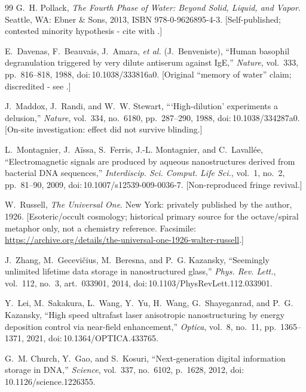 \documentclass[11pt]{article}
\theoremstyle{definition}
\begin{document}
\begin{thebibliography}{99}
G.~H. Pollack, \emph{The Fourth Phase of Water: Beyond Solid, Liquid, and Vapor}. Seattle,
WA: Ebner \& Sons, 2013, ISBN 978-0-9626895-4-3. [Self-published; contested minority
hypothesis - cite with \cite{elton2020ez}.]

E.~Davenas, F.~Beauvais, J.~Amara, \emph{et al.} (J.~Benveniste), ``Human basophil
degranulation triggered by very dilute antiserum against IgE,'' \emph{Nature}, vol.~333,
pp.~816--818, 1988, doi:\,10.1038/333816a0. [Original ``memory of water'' claim;
discredited - see \cite{maddox1988}.]

J.~Maddox, J.~Randi, and W.~W. Stewart, ```High-dilution' experiments a delusion,''
\emph{Nature}, vol.~334, no.~6180, pp.~287--290, 1988, doi:\,10.1038/334287a0. [On-site
investigation: effect did not survive blinding.]

L.~Montagnier, J.~A\"issa, S.~Ferris, J.-L. Montagnier, and C.~Lavall\'ee, ``Electromagnetic
signals are produced by aqueous nanostructures derived from bacterial DNA sequences,''
\emph{Interdiscip. Sci. Comput. Life Sci.}, vol.~1, no.~2, pp.~81--90, 2009,
doi:\,10.1007/s12539-009-0036-7. [Non-reproduced fringe revival.]

W.~Russell, \emph{The Universal One}. New York: privately published by the author, 1926.
[Esoteric/occult cosmology; historical primary source for the octave/spiral metaphor only,
not a chemistry reference. Facsimile: \url{https://archive.org/details/the-universal-one-1926-walter-russell}.]

J.~Zhang, M.~Gecevi\v{c}ius, M.~Beresna, and P.~G. Kazansky, ``Seemingly unlimited lifetime
data storage in nanostructured glass,'' \emph{Phys. Rev. Lett.}, vol.~112, no.~3,
art.~033901, 2014, doi:\,10.1103/PhysRevLett.112.033901.

Y.~Lei, M.~Sakakura, L.~Wang, Y.~Yu, H.~Wang, G.~Shayeganrad, and P.~G. Kazansky, ``High
speed ultrafast laser anisotropic nanostructuring by energy deposition control via
near-field enhancement,'' \emph{Optica}, vol.~8, no.~11, pp.~1365--1371, 2021,
doi:\,10.1364/OPTICA.433765.

G.~M. Church, Y.~Gao, and S.~Kosuri, ``Next-generation digital information storage in DNA,''
\emph{Science}, vol.~337, no.~6102, p.~1628, 2012, doi:\,10.1126/science.1226355.


\end{thebibliography}
\end{document}
